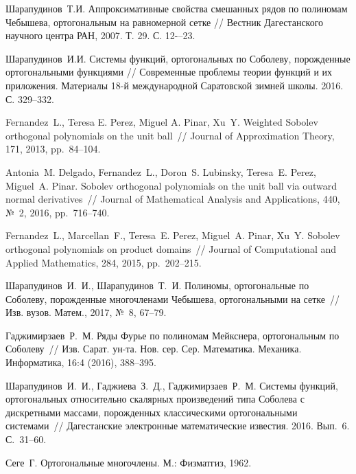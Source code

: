 \begin{thebibliography}{99}
{Шарапудинов~Т.И.}
Аппроксимативные свойства смешанных рядов по полиномам Чебышева, ортогональным на равномерной сетке //
Вестник Дагестанского научного центра РАН, 2007. Т. 29. С. 12-–23.



{Шарапудинов~И.И.}
Системы функций, ортогональных по Соболеву, порожденные ортогональными функциями //
Современные проблемы теории функций и их приложения.  Материалы 18-й международной Саратовской зимней школы. 2016. С. 329--332.



{Fernandez~L., Teresa E. Perez, Miguel A. Pinar, Xu~Y.} Weighted Sobolev orthogonal polynomials on the unit ball~// Journal of Approximation Theory, 171, 2013, pp.~84--104.



{Antonia~M. Delgado, Fernandez~L., Doron~S. Lubinsky, Teresa~E. Perez, Miguel~A. Pinar.} Sobolev orthogonal polynomials on the unit ball via outward normal derivatives~// Journal of Mathematical Analysis and Applications, 440, №~2, 2016, pp.~716--740.



{Fernandez~L., Marcellan~F., Teresa~E. Perez, Miguel~A. Pinar, Xu~Y.} Sobolev orthogonal polynomials on product domains~// Journal of Computational and Applied Mathematics, 284, 2015, pp.~202--215.



{Шарапудинов~И.~И., Шарапудинов~Т.~И.} Полиномы, ортогональные по Соболеву, порожденные многочленами Чебышева, ортогональными на сетке~// Изв. вузов. Матем., 2017, №~8, 67--79.



{Гаджимирзаев~Р.~М.} Ряды Фурье по полиномам Мейкснера, ортогональным по Соболеву~// Изв. Сарат. ун-та. Нов. сер. Сер. Математика. Механика. Информатика, 16:4 (2016), 388--395.



{Шарапудинов~И.~И., Гаджиева~З.~Д., Гаджимирзаев~Р.~М.} Системы функций, ортогональных относительно скалярных произведений типа Соболева с дискретными массами, порожденных классическими ортогональными системами~// Дагестанские электронные математические известия. 2016. Вып.~6. С.~31--60.



{Сеге~Г.} Ортогональные многочлены. М.: Физматгиз, 1962.



\end{thebibliography}

